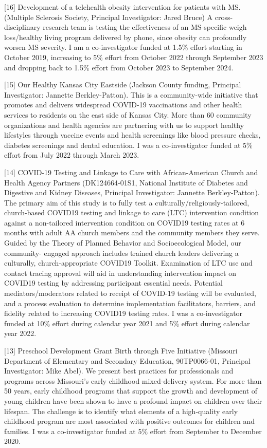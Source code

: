\documentclass[
  12pt,
]{article}
\begin{document}
{[}16{]} Development of a telehealth obesity intervention for patients
with MS. (Multiple Sclerosis Society, Principal Investigator: Jared
Bruce) A cross-disciplinary research team is testing the effectiveness
of an MS-specific weigh loss/healthy living program delivered by phone,
since obesity can profoundly worsen MS severity. I am a co-investigator
funded at 1.5\% effort starting in October 2019, increasing to 5\%
effort from October 2022 through September 2023 and dropping back to
1.5\% effort from October 2023 to September 2024.

{[}15{]} Our Healthy Kansas City Eastside (Jackson County funding,
Principal Investigator: Jannette Berkley-Patton). This is a
community-wide initiative that promotes and delivers widespread COVID-19
vaccinations and other health services to residents on the east side of
Kansas City. More than 60 community organizations and health agencies
are partnering with us to support healthy lifestyles through vaccine
events and health screenings like blood pressure checks, diabetes
screenings and dental education. I was a co-investigator funded at 5\%
effort from July 2022 through March 2023.

{[}14{]} COVID-19 Testing and Linkage to Care with African-American
Church and Health Agency Partners (DK124664-01S1, National Institute of
Diabetes and Digestive and Kidney Diseases, Principal Investigator:
Jannette Berkley-Patton). The primary aim of this study is to fully test
a culturally/religiously-tailored, church-based COVID19 testing and
linkage to care (LTC) intervention condition against a non-tailored
intervention condition on COVID19 testing rates at 6 months with adult
AA church members and the community members they serve. Guided by the
Theory of Planned Behavior and Socioecological Model, our community-
engaged approach includes trained church leaders delivering a
culturally, church-appropriate COVID19 Toolkit. Examination of LTC use
and contact tracing approval will aid in understanding intervention
impact on COVID19 testing by addressing participant essential needs.
Potential mediators/moderators related to receipt of COVID-19 testing
will be evaluated, and a process evaluation to determine implementation
facilitators, barriers, and fidelity related to increasing COVID19
testing rates. I was a co-investigator funded at 10\% effort during
calendar year 2021 and 5\% effort during calendar year 2022.

{[}13{]} Preschool Development Grant Birth through Five Initiative
(Missouri Department of Elementary and Secondary Education, 90TP0066-01,
Principal Investigator: Mike Abel). We present best practices for
professionals and programs across Missouri's early childhood
mixed-delivery system. For more than 50 years, early childhood programs
that support the growth and development of young children have been
shown to have a profound impact on children over their lifespan. The
challenge is to identify what elements of a high-quality early childhood
program are most associated with positive outcomes for children and
families. I was a co-investigator funded at 5\% effort from September to
December 2020.
\end{document}
